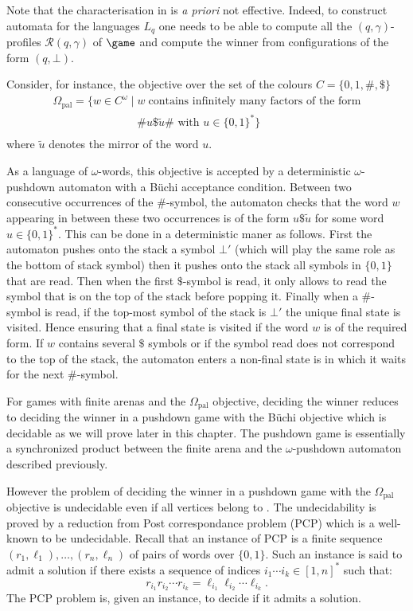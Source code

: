 \begin{remark}
Note that the characterisation in  is \emph{a priori} not effective. Indeed, to construct automata for the languages $L_q$ one needs to be able to compute all the $(q,\gamma)$-profiles $\mathcal{R}(q,\gamma)$ of $\game$ and compute
the winner from configurations of the form $(q,\bot)$. 

\newcommand{\Omegapar}{\Omega_{\textrm{pal}}} 
Consider, for instance, the objective over the set of the colours $C=\{0,1,\#,\$\}$
\[
\begin{array}{l}
\Omegapar = \{ w \in C^\omega \mid w \;\textrm{contains infinitely many factors of the form}\\
\quad\quad\quad\quad\quad\quad\quad\;\;\textrm{$\#u\$\tilde{u}\#$ with $u \in \{0,1\}^*$} \} \\
\end{array}
\]
where $\tilde{u}$ denotes the mirror of the word $u$.

As a language of $\omega$-words, this objective is accepted by a deterministic $\omega$-pushdown automaton with a Büchi acceptance condition. Between two consecutive occurrences of the $\#$-symbol, the automaton checks that the word $w$ appearing in between these two occurrences is of the form
$u\$\tilde{u}$ for some word $u \in \{0,1\}^*$. This can be done in a deterministic maner as follows. First the automaton pushes onto the stack a symbol $\bot'$ (which will play the same role as the bottom of stack symbol) then it pushes onto the stack all symbols in $\{0,1\}$ that are read. Then when the first $\$$-symbol is read, it only allows to read the symbol that is on the top of the stack before popping it. Finally when a $\#$-symbol is read, if the top-most symbol of the stack is $\bot'$  the unique final state is visited. Hence ensuring that a final state is visited if the word $w$ is of the required form. If $w$ contains several $\$$ symbols or if the symbol read does not correspond to the top of the stack, the automaton enters a non-final state is in which it waits for the next $\#$-symbol.

For games with finite arenas and the $\Omegapar$ objective,  deciding the winner reduces to deciding the winner in a  pushdown game with the Büchi objective which is decidable as we will prove later in this chapter. The pushdown game is essentially a synchronized product between the finite arena and the $\omega$-pushdown automaton described previously.

However the problem of deciding the winner in a pushdown game with the $\Omegapar$ objective is undecidable even if all vertices belong to \Eve. The undecidability is proved by a reduction from  Post correspondance problem (PCP) which is a well-known to be undecidable. Recall that an instance of PCP is a finite sequence $(r_1,\ell_1),\ldots,(r_n,\ell_n)$ of pairs of words over $\{0,1\}$. Such an instance is said to admit a solution if there exists a sequence of indices $i_1\cdots i_k \in [1,n]^*$ such that:
\[
 r_{i_1} r_{i_2} \cdots r_{i_k} = \ell_{i_1} \ell_{i_2} \cdots \ell_{i_k}.
\]
The PCP problem is, given an instance, to decide if it admits a solution.
 

\end{remark}
